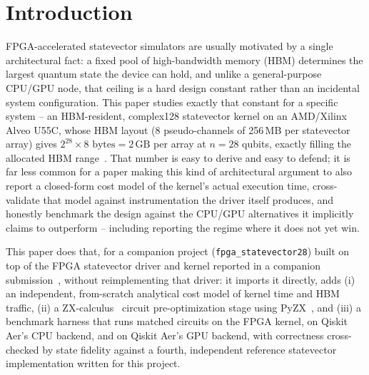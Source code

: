 \documentclass[pdflatex,sn-mathphys,Numbered]{sn-jnl}
\begin{document}

\maketitle

\section{Introduction}\label{sec:intro}

FPGA-accelerated statevector simulators are usually motivated by a single architectural fact: a fixed pool of high-bandwidth memory (HBM) determines the largest quantum state the device can hold, and unlike a general-purpose CPU/GPU node, that ceiling is a hard design constant rather than an incidental system configuration. This paper studies exactly that constant for a specific system -- an HBM-resident, complex128 statevector kernel on an AMD/Xilinx Alveo U55C, whose HBM layout (8 pseudo-channels of 256\,MB per statevector array) gives $2^{28}\times 8\text{ bytes} = 2\,\text{GB}$ per array at $n=28$ qubits, exactly filling the allocated HBM range~\cite{ali_rtl_statevector}. That number is easy to derive and easy to defend; it is far less common for a paper making this kind of architectural argument to also report a closed-form cost model of the kernel's actual execution time, cross-validate that model against instrumentation the driver itself produces, and honestly benchmark the design against the CPU/GPU alternatives it implicitly claims to outperform -- including reporting the regime where it does not yet win.

This paper does that, for a companion project (\texttt{fpga\_statevector28}) built on top of the FPGA statevector driver and kernel reported in a companion submission~\cite{ali_rtl_statevector}, without reimplementing that driver: it imports it directly, adds (i) an independent, from-scratch analytical cost model of kernel time and HBM traffic, (ii) a ZX-calculus~\cite{coecke2011,vandewetering2020} circuit pre-optimization stage using PyZX~\cite{kissinger2020}, and (iii) a benchmark harness that runs matched circuits on the FPGA kernel, on Qiskit Aer's CPU backend, and on Qiskit Aer's GPU backend, with correctness cross-checked by state fidelity against a fourth, independent reference statevector implementation written for this project.
\end{document}
